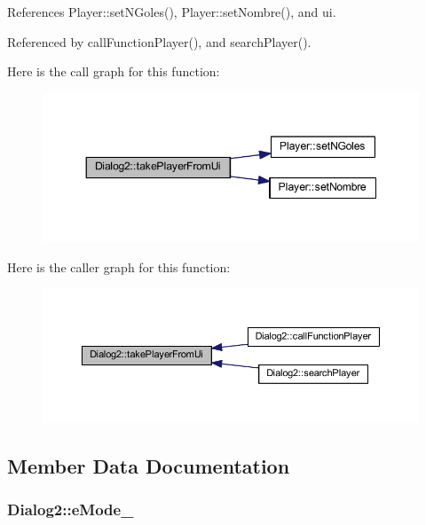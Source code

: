 References Player\+::set\+N\+Goles(), Player\+::set\+Nombre(), and ui.



Referenced by call\+Function\+Player(), and search\+Player().



Here is the call graph for this function\+:
\nopagebreak
\begin{figure}[H]
\begin{center}
\leavevmode
\includegraphics[width=348pt]{d8/dad/class_dialog2_a7d1f42eb6a8798be34da38e4df4929f7_cgraph}
\end{center}
\end{figure}




Here is the caller graph for this function\+:
\nopagebreak
\begin{figure}[H]
\begin{center}
\leavevmode
\includegraphics[width=350pt]{d8/dad/class_dialog2_a7d1f42eb6a8798be34da38e4df4929f7_icgraph}
\end{center}
\end{figure}




\subsection{Member Data Documentation}
\hypertarget{class_dialog2_a30d760908a70fc65c73499b96c177d46}{}
\subsubsection[{e\+Mode\+\_\+}]{ Dialog2\+::e\+Mode\+\_\+\hspace{0.3cm}{\ttfamily [private]}}\label{class_dialog2_a30d760908a70fc65c73499b96c177d46}


